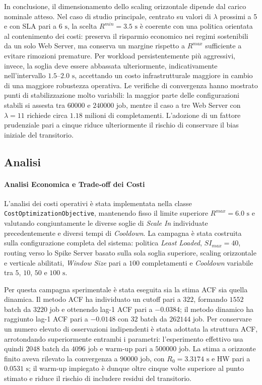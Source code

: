 ﻿\documentclass[a4paper,12pt]{article}
\begin{document}
In conclusione, il dimensionamento dello scaling orizzontale dipende dal carico nominale atteso. Nel caso di studio principale, centrato su valori di $\lambda$ prossimi a 5 e con SLA pari a $6\text{ s}$, la scelta \textbf{$R^{min}=3.5\text{ s}$} è coerente con una politica orientata al contenimento dei costi: preserva il risparmio economico nei regimi sostenibili da un solo Web Server, ma conserva un margine rispetto a $R^{max}$ sufficiente a evitare rimozioni premature. Per workload persistentemente più aggressivi, invece, la soglia deve essere abbassata ulteriormente, indicativamente nell'intervallo $1.5$--$2.0\text{ s}$, accettando un costo infrastrutturale maggiore in cambio di una maggiore robustezza operativa. Le verifiche di convergenza hanno mostrato punti di stabilizzazione molto variabili: la maggior parte delle configurazioni stabili si assesta tra $60000$ e $240000$ job, mentre il caso a tre Web Server con $\lambda=11$ richiede circa $1.18$ milioni di completamenti. L'adozione di un fattore prudenziale pari a cinque riduce ulteriormente il rischio di conservare il bias iniziale del transitorio.


\subsection{Analisi}

\paragraph{Analisi Economica e Trade-off dei Costi}
L'analisi dei costi operativi è stata implementata nella classe \texttt{CostOptimizationObjective}, mantenendo fisso il limite superiore $R^{max}=6.0\text{ s}$ e valutando congiuntamente le diverse soglie di \textit{Scale In} individuate precedentemente e diversi tempi di \textit{Cooldown}. La campagna è stata costruita sulla configurazione completa del sistema: politica \textit{Least Loaded}, $SI_{max}=40$, routing verso lo Spike Server basato sulla sola soglia superiore, scaling orizzontale e verticale abilitati, \textit{Window Size} pari a $100$ completamenti e \textit{Cooldown} variabile tra $5$, $10$, $50$ e $100\text{ s}$.

Per questa campagna sperimentale è stata eseguita sia la stima ACF sia quella dinamica. Il metodo ACF ha individuato un cutoff pari a $322$, formando $1552$ batch da $3220$ job e ottenendo lag-1 ACF pari a $-0.0384$; il metodo dinamico ha raggiunto lag-1 ACF pari a $-0.0148$ con $32$ batch da $262144$ job. Per conservare un numero elevato di osservazioni indipendenti è stata adottata la struttura ACF, arrotondando superiormente entrambi i parametri: l'esperimento effettivo usa quindi $2048$ batch da $4096$ job e warm-up pari a $500000$ job. La stima a orizzonte finito aveva rilevato la convergenza a $90000$ job, con $R_0=3.3174\text{ s}$ e HW pari a $0.0531\text{ s}$; il warm-up impiegato è dunque oltre cinque volte superiore al punto stimato e riduce il rischio di includere residui del transitorio.
\end{document}

